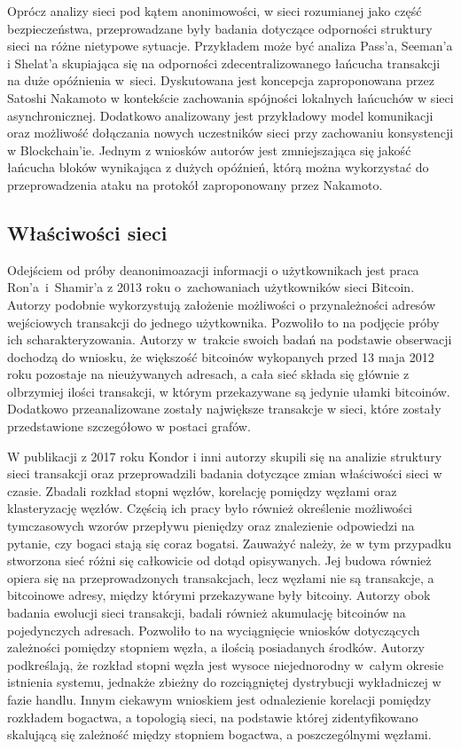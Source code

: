 \documentclass[12pt, twoside, final, openany]{mgr}
\begin{document}
\indent Oprócz analizy sieci pod kątem anonimowości, w sieci rozumianej jako część bezpieczeństwa, przeprowadzane były badania dotyczące odporności struktury sieci na różne nietypowe sytuacje. Przykładem może być analiza Pass'a, Seeman'a i Shelat'a\cite{Pass2017} skupiająca się na odporności zdecentralizowanego łańcucha transakcji na duże opóźnienia w~sieci. Dyskutowana jest koncepcja zaproponowana przez Satoshi Nakamoto\cite{nakamoto2008bitcoin} w kontekście zachowania spójności lokalnych łańcuchów w sieci asynchronicznej. Dodatkowo analizowany jest przykładowy model komunikacji oraz możliwość dołączania nowych uczestników sieci przy zachowaniu konsystencji w Blockchain'ie. Jednym z wniosków autorów jest zmniejszająca się jakość łańcucha bloków wynikająca z dużych opóźnień, którą można wykorzystać do przeprowadzenia ataku na protokół zaproponowany przez Nakamoto.

\newpage
\subsection{Właściwości sieci}

\indent Odejściem od próby deanonimoazacji informacji o użytkownikach jest praca Ron'a~i~Shamir'a z 2013 roku o~zachowaniach użytkowników sieci Bitcoin\cite{Ron2013}. Autorzy podobnie wykorzystują założenie możliwości o przynależności adresów wejściowych transakcji do jednego użytkownika. Pozwoliło to na podjęcie próby ich scharakteryzowania. Autorzy w~trakcie swoich badań na podstawie obserwacji dochodzą do wniosku, że większość bitcoinów wykopanych przed 13 maja 2012 roku pozostaje na nieużywanych adresach, a cała sieć składa się głównie z olbrzymiej ilości transakcji, w którym przekazywane są jedynie ułamki bitcoinów. Dodatkowo przeanalizowane zostały największe transakcje w sieci, które zostały przedstawione szczegółowo w postaci grafów. 

\indent W publikacji z 2017 roku Kondor i inni autorzy\cite{Kondor2014} skupili się na analizie struktury sieci transakcji oraz przeprowadzili badania dotyczące zmian właściwości sieci w czasie. Zbadali rozkład stopni węzłów, korelację pomiędzy węzłami oraz klasteryzację węzłów. Częścią ich pracy było również określenie możliwości tymczasowych wzorów przepływu pieniędzy oraz znalezienie odpowiedzi na pytanie, czy bogaci stają się coraz bogatsi. Zauważyć należy, że w tym przypadku stworzona sieć różni się całkowicie od dotąd opisywanych. Jej budowa również opiera się na przeprowadzonych transakcjach, lecz węzłami nie są transakcje, a bitcoinowe adresy, między którymi przekazywane były bitcoiny. Autorzy obok badania ewolucji sieci transakcji, badali również akumulację bitcoinów na pojedynczych adresach. Pozwoliło to na wyciągnięcie wniosków dotyczących zależności pomiędzy stopniem węzła, a ilością posiadanych środków. Autorzy podkreślają, że rozkład stopni węzła jest wysoce niejednorodny w~całym okresie istnienia systemu, jednakże zbieżny do rozciągniętej dystrybucji wykładniczej w fazie handlu. Innym ciekawym wnioskiem jest odnalezienie korelacji pomiędzy rozkładem bogactwa, a topologią sieci, na podstawie której zidentyfikowano skalującą się zależność między stopniem bogactwa, a poszczególnymi węzłami.
\end{document}
